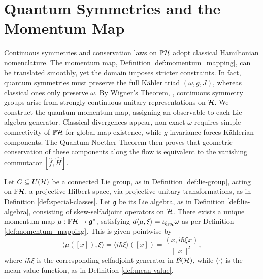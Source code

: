 \section{Quantum Symmetries and the Momentum Map}
\label{sec:quantum-momentum-map}

Continuous symmetries and conservation laws on $\PH$ adopt classical Hamiltonian nomenclature. The momentum map, Definition \ref{def:momentum_mapping}, can be translated smoothly, yet the domain imposes stricter constraints. In fact, quantum symmetries must preserve the full Kähler triad $(\omega,g,J)$, whereas classical ones only preserve $\omega$. By Wigner's Theorem, \cite[Theorem 12.11]{morettiSpectralTheoryQuantum}, continuous symmetry groups arise from strongly continuous unitary representations on $\H$. We construct the quantum momentum map, assigning an observable to each Lie-algebra generator. Classical divergences appear, non-exact $\omega$ requires simple connectivity of $\PH$ for global map existence, while $g$-invariance forces Kählerian components. The Quantum Noether Theorem then proves that geometric conservation of these components along the flow is equivalent to the vanishing commutator $[\hat{f},\hat{H}]$.

\begin{proposition}
	\label{prop:quantum-momentum-map}
	Let $G \subseteq U(\H)$ be a connected Lie group, as in Definition \ref{def:lie-group}, acting on $\PH$, a projective Hilbert space, via projective unitary transformations, as in Definition \ref{def:special-classes}. Let $\mathfrak{g}$ be its Lie algebra, as in Definition \ref{def:lie-algebra}, consisting of skew-selfadjoint operators on $\H$. There exists a unique momentum map $\mu: \PH \to \mathfrak{g}^*$, satisfying $d\langle \mu, \xi \rangle = \iota_{\xi_{\PH}} \omega$ as per Definition \ref{def:momentum_mapping}. This is given pointwise by
	\begin{equation}
		\langle \mu([x]), \xi \rangle = \langle i\hbar \xi \rangle([x]) = \frac{(x, i\hbar \xi x)}{\|x\|^2},
	\end{equation}
	where $i\hbar \xi$ is the corresponding selfadjoint generator in $\BH$, while $\langle \cdot \rangle$ is the mean value function, as in Definition \ref{def:mean-value}.
\end{proposition}

